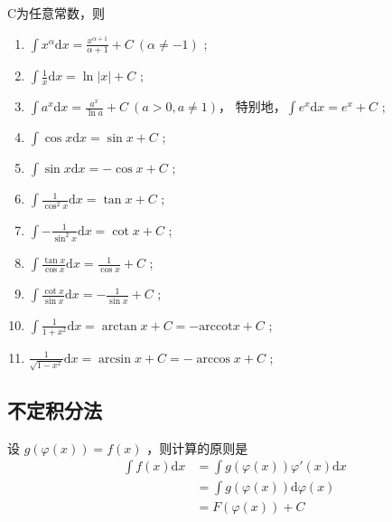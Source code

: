 \begin{Field}[基本积分公式]

    C为任意常数，则
    \begin{enumerate}
        \item $ \int x^\alpha \mathrm{d}x = \frac{x^{\alpha +1}}{\alpha + 1} + C\ (\alpha \neq -1) $ ;
        \item $ \int \frac{1}{x} \mathrm{d}x = \ln|x| + C $ ;
        \item $ \int a^x \mathrm{d}x = \frac{a^x}{\ln a} + C\ (a>0,a\neq 1) $，
        特别地，$ \int e^x\mathrm{d}x = e^x+C $ ;
        \item $ \int \cos x \mathrm{d}x = \sin x + C $ ;
        \item $ \int \sin x \mathrm{d}x = -\cos x + C $ ;
        \item $ \int \frac{1}{\cos^2 x}\mathrm{d}x = \tan x + C $ ;
        \item $ \int -\frac{1}{\sin^2 x}\mathrm{d}x = \cot x + C $ ;
        \item $ \int \frac{\tan x}{\cos x} \mathrm{d}x = \frac{1}{\cos x} + C $ ;
        \item $ \int \frac{\cot x}{\sin x}\mathrm{d}x = -\frac{1}{\sin x} + C $ ;
        \item $ \int \frac{1}{1+x^2}\mathrm{d}x = \arctan x + C = -\textrm{arccot} x + C $ ;
        \item $ \frac{1}{\sqrt{1-x^2}}\mathrm{d}x = \arcsin x + C = -\arccos x + C $ ;
    \end{enumerate}
\end{Field}

\subsection{不定积分法}

\begin{Field}

    设 $ g(\varphi(x)) = f(x) $ ，则计算的原则是
    \begin{equation*}
        \begin{aligned}
            \int f(x)\mathrm{d}x &= \int g(\varphi(x))\varphi'(x)\mathrm{d}x \\
            &= \int g(\varphi(x))\mathrm{d}\varphi(x) \\ 
            &= F(\varphi(x))+ C
        \end{aligned}
    \end{equation*}
\end{Field}

